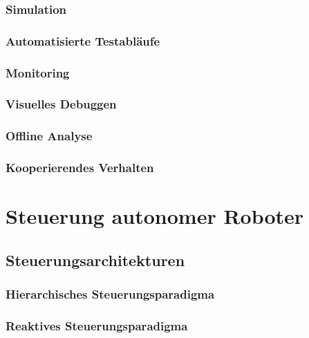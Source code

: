 \documentclass[a4paper, 11pt, accentcolor = tud3b]{tudreport}
\begin{document}
			\subsection{Simulation} %

			\subsection{Automatisierte Testabläufe} %

			\subsection{Monitoring} %

			\subsection{Visuelles Debuggen} %

			\subsection{Offline Analyse} %

			\subsection{Kooperierendes Verhalten} %

	\chapter{Steuerung autonomer Roboter} %

		\section{Steuerungsarchitekturen} %

			\subsection{Hierarchisches Steuerungsparadigma} %

			\subsection{Reaktives Steuerungsparadigma} %
\end{document}
